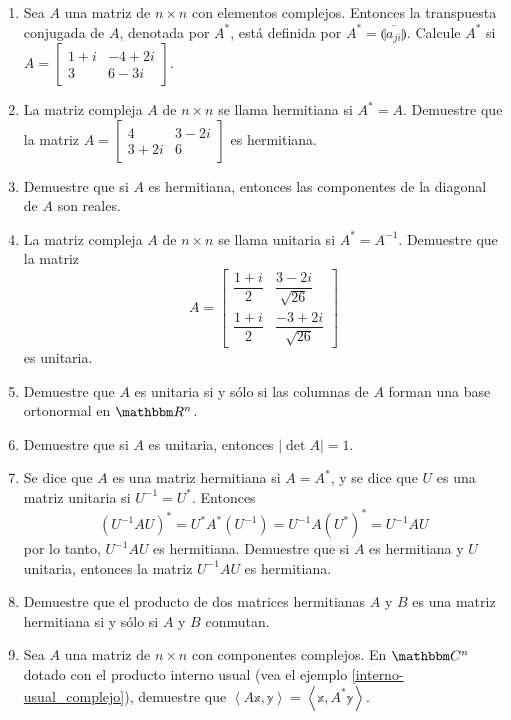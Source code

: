 \begin{enumerate}[start=62]
    \item Sea $A$ una matriz de $n \times n$ con elementos complejos. Entonces la transpuesta conjugada de $A$, denotada por $A^{*}$, está definida por $A^{*} = \overline{\llparenthesis a_{j i} \rrparenthesis}$. Calcule $A^{*}$ si $A = \begin{bmatrix} 1+i & -4+2 i \\ 3 & 6-3 i \end{bmatrix}$.
    \item La matriz compleja $A$ de $n \times n$ se llama hermitiana si $A^{*} = A$. Demuestre que la matriz $A = \begin{bmatrix} 4 & 3-2 i \\ 3+2 i & 6 \end{bmatrix}$ es hermitiana.
    \item Demuestre que si $A$ es hermitiana, entonces las componentes de la diagonal de $A$ son reales.
    \item La matriz compleja $A$ de $n \times n$ se llama unitaria si $A^{*}=A^{-1}$. Demuestre que la matriz
    $$A = \begin{bmatrix}
        \dfrac{1+i}{2} & \dfrac{3-2 i}{\sqrt{26}} \\[3mm]
        \dfrac{1+i}{2} & \dfrac{-3+2 i}{\sqrt{26}}
    \end{bmatrix}$$
    es unitaria.\newpage
    \item Demuestre que $A$ es unitaria si y sólo si las columnas de $A$ forman una base ortonormal en $\RR[n]$.
    \item Demuestre que si $A$ es unitaria, entonces $|\operatorname{det} A| = 1$.
    \item Se dice que $A$ es una matriz hermitiana si $A=A^{*}$, y se dice que $U$ es una matriz unitaria si $U^{-1}=U^{*}$. Entonces
    $$\left(U^{-1} A U\right)^{*}=U^{*} A^{*}\left(U^{-1}\right)=U^{-1} A\left(U^{*}\right)^{*}=U^{-1} A U$$
    por lo tanto, $U^{-1} A U$ es hermitiana. Demuestre que si $A$ es hermitiana y $U$ unitaria, entonces la matriz $U^{-1} A U$ es hermitiana.
    \item Demuestre que el producto de dos matrices hermitianas $A$ y $B$ es una matriz hermitiana si y sólo si $A$ y $B$ conmutan.
    \item Sea $A$ una matriz de $n \times n$ con componentes complejos. En $\CC[n]$ dotado con el producto interno usual (vea el ejemplo \ref{interno-usual_complejo}), demuestre que $\left\langle A \mathbb{x}, \mathbb{y} \right\rangle = \left\langle \mathbb{x}, A^{*} \mathbb{y} \right\rangle$.

\end{enumerate}
